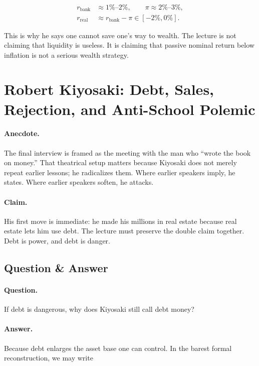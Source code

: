 \begin{align}
r_{\text{bank}} &\approx 1\%\text{--}2\%,\qquad \pi \approx 2\%\text{--}3\%,\\
r_{\text{real}} &\approx r_{\text{bank}} - \pi \in [-2\%,0\%].
\end{align}

This is why he says one cannot save one's way to wealth. The lecture is not claiming that liquidity is useless. It is claiming that passive nominal return below inflation is not a serious wealth strategy.

\section{Robert Kiyosaki: Debt, Sales, Rejection, and Anti-School Polemic}

\paragraph{Anecdote.} The final interview is framed as the meeting with the man who ``wrote the book on money.'' That theatrical setup matters because Kiyosaki does not merely repeat earlier lessons; he radicalizes them. Where earlier speakers imply, he states. Where earlier speakers soften, he attacks.

\paragraph{Claim.} His first move is immediate: he made his millions in real estate because real estate lets him use debt. The lecture must preserve the double claim together. Debt is power, and debt is danger.

\subsection{Question \& Answer}

\paragraph{Question.} If debt is dangerous, why does Kiyosaki still call debt money?

\paragraph{Answer.} Because debt enlarges the asset base one can control. In the barest formal reconstruction, we may write

